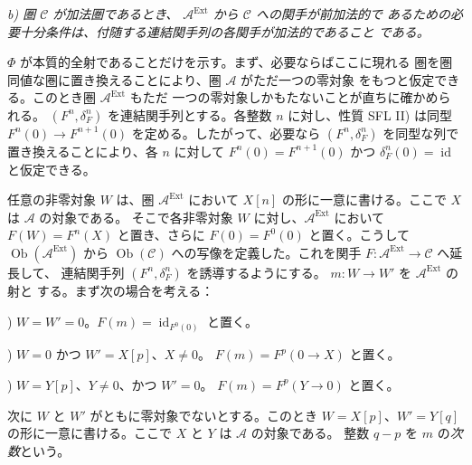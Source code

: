 \clearpage
{}%
\begingroup\small\setlength{\parskip}{0pt}\setlength{\emergencystretch}{1.5em}
\setlength{\abovedisplayskip}{4pt plus 2pt minus 2pt}%
\setlength{\belowdisplayskip}{4pt plus 2pt minus 2pt}%

\noindent\textit{b) 圏 $\mathcal C$ が加法圏であるとき、
$\mathcal A^{\operatorname{Ext}}$ から $\mathcal C$ への関手が前加法的で
あるための必要十分条件は、付随する連結関手列の各関手が加法的であること
である。}

$\Phi$ が本質的全射であることだけを示す。まず、必要ならばここに現れる
圏を圏同値な圏に置き換えることにより、圏 $\mathcal A$ がただ一つの零対象
をもつと仮定できる。このとき圏 $\mathcal A^{\operatorname{Ext}}$ もただ
一つの零対象しかもたないことが直ちに確かめられる。
$(F^n,\delta_F^n)$ を連結関手列とする。各整数 $n$ に対し、性質 SFL II)
は同型 $F^n(0)\longrightarrow F^{n+1}(0)$ を定める。したがって、必要なら
$(F^n,\delta_F^n)$ を同型な列で置き換えることにより、各 $n$ に対して
$F^n(0)=F^{n+1}(0)$ かつ $\delta_F^n(0)=\operatorname{id}$ と仮定できる。

任意の非零対象 $W$ は、圏 $\mathcal A^{\operatorname{Ext}}$ において
$X[n]$ の形に一意に書ける。ここで $X$ は $\mathcal A$ の対象である。
そこで各非零対象 $W$ に対し、$\mathcal A^{\operatorname{Ext}}$ において
$F(W)=F^n(X)$ と置き、さらに $F(0)=F^0(0)$ と置く。こうして
$\operatorname{Ob}(\mathcal A^{\operatorname{Ext}})$ から
$\operatorname{Ob}(\mathcal C)$ への写像を定義した。これを関手
$F\colon\mathcal A^{\operatorname{Ext}}\longrightarrow\mathcal C$ へ延長して、
連結関手列 $(F^n,\delta_F^n)$ を誘導するようにする。
$m\colon W\longrightarrow W'$ を $\mathcal A^{\operatorname{Ext}}$ の射と
する。まず次の場合を考える：

) $W=W'=0$。$F(m)=\operatorname{id}_{F^0(0)}$ と置く。

) $W=0$ かつ $W'=X[p]$、$X\neq0$。
$F(m)=F^p(0\longrightarrow X)$ と置く。

) $W=Y[p]$、$Y\neq0$、かつ $W'=0$。
$F(m)=F^p(Y\longrightarrow0)$ と置く。

次に $W$ と $W'$ がともに零対象でないとする。このとき
$W=X[p]$、$W'=Y[q]$ の形に一意に書ける。ここで $X$ と $Y$ は
$\mathcal A$ の対象である。
整数 $q-p$ を $m$ の\emph{次数}という。

